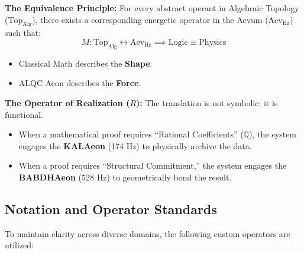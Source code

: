 \documentclass[11pt, letterpaper]{article}
\newcommand{\KAL}{\ensuremath{\mathop{\textnormal{\symbolafont\symbol{"29C9}}}}}    %
\newcommand{\BABDH}{\ensuremath{\mathop{\textnormal{\symbolafont\symbol{"2316}}}}}   %
\def\KAL{KAL}%
\def\BABDH{BABDH}%
\begin{document}
\vspace{1em}
\noindent \textbf{The Equivalence Principle:} For every abstract operant in Algebraic Topology ($\text{Top}_{\text{Alg}}$), there exists a corresponding energetic operator in the Aevum ($\text{Aev}_{\text{Hz}}$) such that:
\begin{equation}
    M: \text{Top}_{\text{Alg}} \leftrightarrow \text{Aev}_{\text{Hz}} \implies \text{Logic} \equiv \text{Physics}
\end{equation}
\begin{itemize}
    \item Classical Math describes the \textbf{Shape}.
    \item ALQC Aeon describes the \textbf{Force}.
\end{itemize}

\vspace{1em}
\noindent \textbf{The Operator of Realization ($R$):} The translation is not symbolic; it is functional. 
\begin{itemize}
    \item When a mathematical proof requires ``Rational Coefficients'' ($\mathbb{Q}$), the system engages the \textbf{\KAL Aeon} (174 Hz) to physically archive the data.
    \item When a proof requires ``Structural Commitment,'' the system engages the \textbf{\BABDH Aeon} (528 Hz) to geometrically bond the result.
\end{itemize}

\subsection*{Notation and Operator Standards}\label{sec:3.2}
\label{sec:gloss_notation}

To maintain clarity across diverse domains, the following custom operators are utilized:
\end{document}
